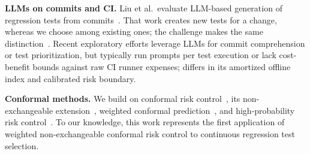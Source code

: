 \textbf{LLMs on commits and CI.} Liu et al.\ evaluate LLM-based generation of regression tests from commits~\cite{liu2026cleverest}. That work creates new tests for a change, whereas we choose among existing ones; the challenge makes the same distinction~\cite{challenge}. Recent exploratory efforts leverage LLMs for commit comprehension or test prioritization, but typically run prompts per test execution or lack cost-benefit bounds against raw CI runner expenses; \tool{} differs in its amortized offline index and calibrated risk boundary.

\textbf{Conformal methods.} We build on conformal risk control~\cite{angelopoulos2024crc}, its non-exchangeable extension~\cite{farinhas2024nonexchangeable}, weighted conformal prediction~\cite{tibshirani2019covariate,barber2023beyond}, and high-probability risk control~\cite{bates2021rcps}. To our knowledge, this work represents the first application of weighted non-exchangeable conformal risk control to continuous regression test selection.
